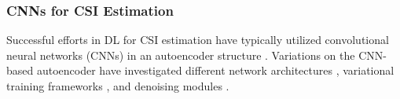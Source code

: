 \subsubsection{CNNs for CSI Estimation}
\label{sect:dl_csi}

Successful efforts in DL for CSI estimation have typically utilized convolutional neural networks (CNNs) in an autoencoder structure \cite{ref:csinet}. Variations on the CNN-based autoencoder have investigated different network architectures \cite{ref:Lu2020CRNet}, variational training frameworks \cite{ref:Hussien2020PRVNet}, and denoising modules \cite{ref:Sun2020AnciNet}.
